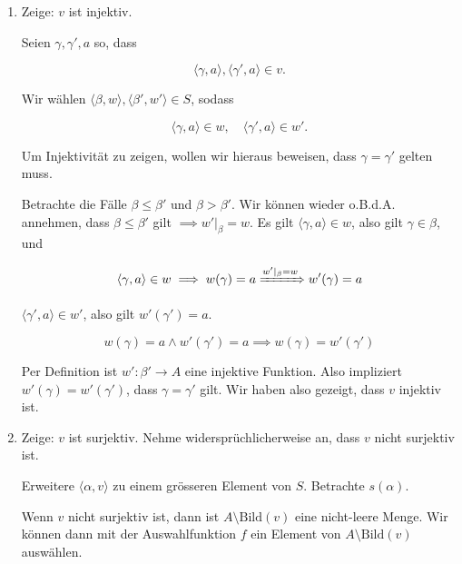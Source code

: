 \documentclass[12pt]{article}
\begin{document}
\begin{enumerate}[label=(\alph*)]
\begin{itemize}
        Wir haben also gezeigt: $\forall \ \gamma, a, a'$, sodass $\langle \gamma, a \rangle, \langle \gamma, a' \rangle \in v$, gilt, $a = a'$. Somit ist v rechtseindeutig.
        
    \end{itemize}

    Da $v$ rechtseindeutig und linktotal ist, können wir folgern, dass $v$ eine Funktion von $\alpha$ nach $A$ ist.

    \item Zeige: $v$ ist injektiv.
    
    Seien $\gamma, \gamma', a$ so, dass 
    
    $$
        \langle \gamma, a \rangle, \langle \gamma', a \rangle \in v.
    $$

    Wir wählen $\langle \beta, w \rangle, \langle \beta', w' \rangle \in S$, sodass

    $$
        \langle \gamma, a \rangle \in w, \quad \langle \gamma', a \rangle \in w'.
    $$

    Um Injektivität zu zeigen, wollen wir hieraus beweisen, dass $\gamma = \gamma'$ gelten muss.

    Betrachte die Fälle $\beta \leq \beta'$ und $\beta > \beta'$. Wir können wieder o.B.d.A. annehmen, dass $\beta \leq \beta'$ gilt $\implies w'|_\beta = w$. Es gilt $\langle \gamma, a \rangle \in w$, also gilt $\gamma \in \beta$, und
    
    $$
        \langle \gamma, a \rangle \in w \implies w(\gamma) = a \xRightarrow{w'|_\beta = w} w'(\gamma) = a
    $$
    
    $\langle \gamma', a \rangle \in w'$, also gilt $w'(\gamma') = a$.

    $$
        w(\gamma) = a \land w'(\gamma') = a \implies w(\gamma) = w'(\gamma')
    $$
    
    Per Definition ist $w': \beta' \rightarrow A$ eine injektive Funktion. Also impliziert $w'(\gamma) = w'(\gamma')$, dass $\gamma = \gamma'$ gilt. Wir haben also gezeigt, dass $v$ injektiv ist.

    \item Zeige: $v$ ist surjektiv. Nehme widersprüchlicherweise an, dass $v$ nicht surjektiv ist. 
    
    Erweitere $\langle \alpha, v \rangle$ zu einem grösseren Element von $S$. Betrachte $s(\alpha)$.

    Wenn $v$ nicht surjektiv ist, dann ist $A \setminus \mathrm{Bild}(v)$ eine nicht-leere Menge. Wir können dann mit der Auswahlfunktion $f$ ein Element von $A \setminus \mathrm{Bild}(v)$ auswählen.


\end{enumerate}
\end{document}
